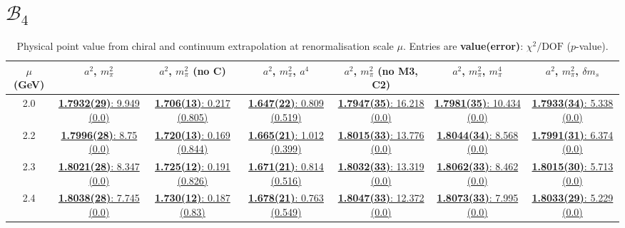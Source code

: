 \documentclass[12pt]{extarticle}
\begin{document}
\section{$\mathcal{B}_4$}
\begin{table}[h!]
\begin{center}
\begin{tabular}{|c|c|c|c|c|c|c|}
\hline
$\mu$ (GeV) & $a^2$, $m_\pi^2$& $a^2$, $m_\pi^2$ (no C)& $a^2$, $m_\pi^2$, $a^4$& $a^2$, $m_\pi^2$ (no M3, C2)& $a^2$, $m_\pi^2$, $m_\pi^4$& $a^2$, $m_\pi^2$, $\delta m_s$\\
\hline
2.0& \hyperlink{SSpPP/SUSY/bag_a2m2_20.pdf.1}{\textbf{1.7932(29)}: 9.949 (0.0)} & \hyperlink{SSpPP/SUSY/bag_a2m2noC_20.pdf.1}{\textbf{1.706(13)}: 0.217 (0.805)} & \hyperlink{SSpPP/SUSY/bag_a2a4m2_20.pdf.1}{\textbf{1.647(22)}: 0.809 (0.519)} & \hyperlink{SSpPP/SUSY/bag_a2m2mcut_20.pdf.1}{\textbf{1.7947(35)}: 16.218 (0.0)} & \hyperlink{SSpPP/SUSY/bag_a2m2m4_20.pdf.1}{\textbf{1.7981(35)}: 10.434 (0.0)} & \hyperlink{SSpPP/SUSY/bag_a2m2delm_20.pdf.1}{\textbf{1.7933(34)}: 5.338 (0.0)}\\
2.2& \hyperlink{SSpPP/SUSY/bag_a2m2_22.pdf.1}{\textbf{1.7996(28)}: 8.75 (0.0)} & \hyperlink{SSpPP/SUSY/bag_a2m2noC_22.pdf.1}{\textbf{1.720(13)}: 0.169 (0.844)} & \hyperlink{SSpPP/SUSY/bag_a2a4m2_22.pdf.1}{\textbf{1.665(21)}: 1.012 (0.399)} & \hyperlink{SSpPP/SUSY/bag_a2m2mcut_22.pdf.1}{\textbf{1.8015(33)}: 13.776 (0.0)} & \hyperlink{SSpPP/SUSY/bag_a2m2m4_22.pdf.1}{\textbf{1.8044(34)}: 8.568 (0.0)} & \hyperlink{SSpPP/SUSY/bag_a2m2delm_22.pdf.1}{\textbf{1.7991(31)}: 6.374 (0.0)}\\
2.3& \hyperlink{SSpPP/SUSY/bag_a2m2_23.pdf.1}{\textbf{1.8021(28)}: 8.347 (0.0)} & \hyperlink{SSpPP/SUSY/bag_a2m2noC_23.pdf.1}{\textbf{1.725(12)}: 0.191 (0.826)} & \hyperlink{SSpPP/SUSY/bag_a2a4m2_23.pdf.1}{\textbf{1.671(21)}: 0.814 (0.516)} & \hyperlink{SSpPP/SUSY/bag_a2m2mcut_23.pdf.1}{\textbf{1.8032(33)}: 13.319 (0.0)} & \hyperlink{SSpPP/SUSY/bag_a2m2m4_23.pdf.1}{\textbf{1.8062(33)}: 8.462 (0.0)} & \hyperlink{SSpPP/SUSY/bag_a2m2delm_23.pdf.1}{\textbf{1.8015(30)}: 5.713 (0.0)}\\
2.4& \hyperlink{SSpPP/SUSY/bag_a2m2_24.pdf.1}{\textbf{1.8038(28)}: 7.745 (0.0)} & \hyperlink{SSpPP/SUSY/bag_a2m2noC_24.pdf.1}{\textbf{1.730(12)}: 0.187 (0.83)} & \hyperlink{SSpPP/SUSY/bag_a2a4m2_24.pdf.1}{\textbf{1.678(21)}: 0.763 (0.549)} & \hyperlink{SSpPP/SUSY/bag_a2m2mcut_24.pdf.1}{\textbf{1.8047(33)}: 12.372 (0.0)} & \hyperlink{SSpPP/SUSY/bag_a2m2m4_24.pdf.1}{\textbf{1.8073(33)}: 7.995 (0.0)} & \hyperlink{SSpPP/SUSY/bag_a2m2delm_24.pdf.1}{\textbf{1.8033(29)}: 5.229 (0.0)}\\
\hline
\end{tabular}
\caption{Physical point value from chiral and continuum extrapolation at renormalisation scale $\mu$. Entries are \textbf{value(error)}: $\chi^2/\text{DOF}$ ($p$-value).}
\end{center}
\end{table}
\end{document}
